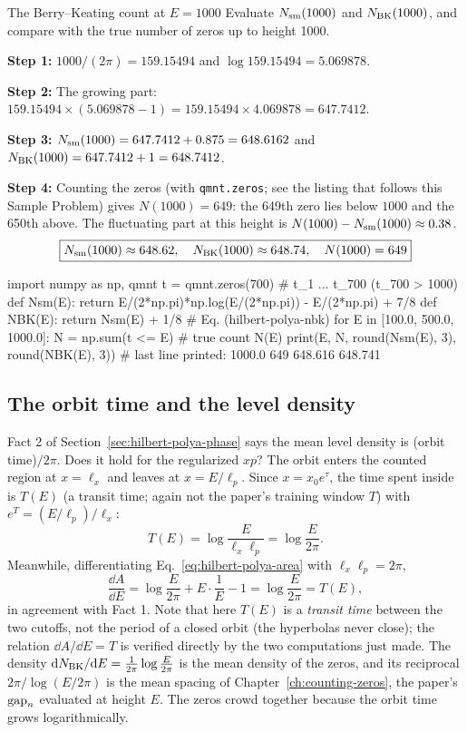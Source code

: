 \begin{sample}{The Berry--Keating count at $E=1000$}
Evaluate $N_{\mathrm{sm}}(1000)$ and $N_{\rm BK}(1000)$, and compare with the true number of zeros up to height 1000.

\textbf{Step 1:} $1000/(2\pi)=159.15494$ and $\log159.15494=5.069878$.

\textbf{Step 2:} The growing part: $159.15494\times(5.069878-1)=159.15494\times4.069878=647.7412$.

\textbf{Step 3:} $N_{\mathrm{sm}}(1000)=647.7412+0.875=648.6162$ and $N_{\rm BK}(1000)=647.7412+1=648.7412$.

\textbf{Step 4:} Counting the zeros (with \texttt{qmnt.zeros}; see the listing that follows this Sample Problem) gives $N(1000)=649$: the 649th zero lies below $1000$ and the 650th above. The fluctuating part at this height is $N(1000)-N_{\mathrm{sm}}(1000)\approx0.38$.
\[
\boxed{N_{\mathrm{sm}}(1000)\approx648.62,\quad N_{\rm BK}(1000)\approx648.74,\quad N(1000)=649}
\]
\end{sample}

\begin{pycode}
import numpy as np, qmnt
t = qmnt.zeros(700)                    # t_1 ... t_700 (t_700 > 1000)
def Nsm(E):  return E/(2*np.pi)*np.log(E/(2*np.pi)) - E/(2*np.pi) + 7/8
def NBK(E):  return Nsm(E) + 1/8       # Eq. (hilbert-polya-nbk)
for E in [100.0, 500.0, 1000.0]:
    N = np.sum(t <= E)                  # true count N(E)
    print(E, N, round(Nsm(E), 3), round(NBK(E), 3))
# last line printed: 1000.0 649 648.616 648.741
\end{pycode}

\subsection{The orbit time and the level density}

Fact 2 of Section~\ref{sec:hilbert-polya-phase} says the mean level density is (orbit time)$/2\pi$. Does it hold for the regularized $xp$? The orbit enters the counted region at $x=\ell_x$ and leaves at $x=E/\ell_p$. Since $x=x_0e^\tau$, the time spent inside is $T(E)$ (a transit time; again not the paper's training window $T$) with $e^{T}=(E/\ell_p)/\ell_x$:
\begin{equation}
T(E)=\log\frac{E}{\ell_x\ell_p}=\log\frac{E}{2\pi}.
\end{equation}
Meanwhile, differentiating Eq.~\eqref{eq:hilbert-polya-area} with $\ell_x\ell_p=2\pi$,
\begin{equation}
\frac{\dd A}{\dd E}=\log\frac{E}{2\pi}+E\cdot\frac1E-1=\log\frac{E}{2\pi}=T(E),
\end{equation}
in agreement with Fact 1. Note that here $T(E)$ is a \emph{transit time} between the two cutoffs, not the period of a closed orbit (the hyperbolas never close); the relation $\dd A/\dd E=T$ is verified directly by the two computations just made. The density $\mathrm{d} N_{\rm BK}/\mathrm{d} E=\frac{1}{2\pi}\log\frac{E}{2\pi}$ is the mean density of the zeros, and its reciprocal $2\pi/\log(E/2\pi)$ is the mean spacing of Chapter~\ref{ch:counting-zeros}, the paper's $\mathrm{gap}_n$ evaluated at height $E$. The zeros crowd together because the orbit time grows logarithmically.

